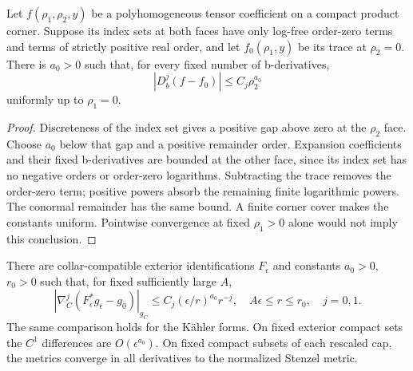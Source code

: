 \begin{lemma}\label{lem:corner-extraction}
Let $f(\rho_1,\rho_2,y)$ be a polyhomogeneous tensor coefficient on a
compact product corner. Suppose its index sets at both faces have only
log-free order-zero terms and terms of strictly positive real order, and
let $f_0(\rho_1,y)$ be its trace at $\rho_2=0$. There is $a_0>0$ such
that, for every fixed number of b-derivatives,
\begin{equation}\label{eq:corner-extraction}
 |D_b^j(f-f_0)|\le C_j\rho_2^{a_0}
\end{equation}
uniformly up to $\rho_1=0$.
\end{lemma}
\begin{proof}
Discreteness of the index set gives a positive gap above zero at the
$\rho_2$ face. Choose $a_0$ below that gap and a positive remainder order.
Expansion coefficients and their fixed b-derivatives are bounded at the
other face, since its index set has no negative orders or order-zero
logarithms. Subtracting the trace removes the order-zero term; positive
powers absorb the remaining finite logarithmic powers. The conormal
remainder has the same bound. A finite corner cover makes the constants
uniform. Pointwise convergence at fixed $\rho_1>0$ alone would not imply
this conclusion.
\end{proof}

\begin{proposition}\label{prop:metric-comparison}
There are collar-compatible exterior identifications $F_\epsilon$ and
constants $a_0>0$, $r_0>0$ such that, for fixed sufficiently large $A$,
\begin{equation}\label{eq:actual-comparison}
 |\nabla_C^j(F_\epsilon^*g_\epsilon-g_0)|_{g_C}
 \le C_j(\epsilon/r)^{a_0}r^{-j},
 \quad A\epsilon\le r\le r_0,\quad j=0,1.
\end{equation}
The same comparison holds for the K\"ahler forms. On fixed exterior
compact sets the $C^1$ differences are $O(\epsilon^{a_0})$.
On fixed compact subsets of each rescaled cap, the metrics converge in
all derivatives to the normalized Stenzel metric.
\end{proposition}

